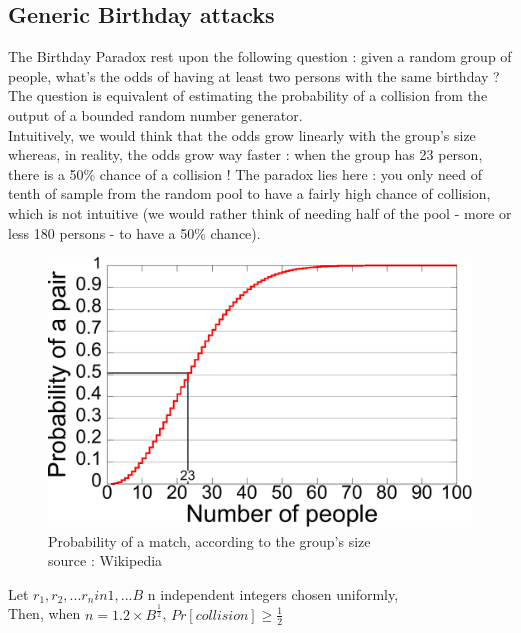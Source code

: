 \subsection{Generic Birthday attacks}

The Birthday Paradox rest upon the following question : given a random group of people, what's the odds of having at least two persons with the same birthday ? The question is equivalent of estimating the probability of a collision from the output of a bounded random number generator.\\

Intuitively, we would think that the odds grow linearly with the group's size whereas, in reality, the odds grow way faster : when the group has 23 person, there is a 50\% chance of a collision ! The paradox lies here : you only need of tenth of sample from the random pool to have a fairly high chance of collision, which is not intuitive (we would rather think of needing half of the pool - more or less 180 persons -  to have a 50\% chance).

\begin{figure}[ht!]
    \centering
   	\includegraphics[width=\textwidth]{images/Birthday_Paradox.pdf}
	\caption{Probability of a match, according to the group's size \\ source : Wikipedia}
	\label{fig:BirthdayParadox}
\end{figure}

\begin{mytheorem}
Let $r_1,r_2,...r_n in {1,...B}$ n independent integers chosen uniformly, \\
Then, when $n = 1.2\times B^{\frac{1}{2}}$, $Pr[collision] \geq \frac{1}{2} $
\end{mytheorem}

